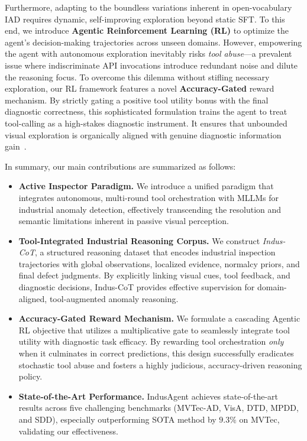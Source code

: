 \documentclass{article}
\begin{document}
Furthermore, adapting to the boundless variations inherent in open-vocabulary IAD requires dynamic, self-improving exploration beyond static SFT. To this end, we introduce \textbf{Agentic Reinforcement Learning (RL)} to optimize the agent's decision-making trajectories across unseen domains. However, empowering the agent with autonomous exploration inevitably risks \emph{tool abuse}—a prevalent issue where indiscriminate API invocations introduce redundant noise and dilute the reasoning focus. To overcome this dilemma without stifling necessary exploration, our RL framework features a novel \textbf{Accuracy-Gated} reward mechanism. By strictly gating a positive tool utility bonus with the final diagnostic correctness, this sophisticated formulation trains the agent to treat tool-calling as a high-stakes diagnostic instrument. It ensures that unbounded visual exploration is organically aligned with genuine diagnostic information gain~\citep{schick2024toolformer, zeng2024agenttuning}.

In summary, our main contributions are summarized as follows:
\begin{itemize}[leftmargin=*,nosep]
    \item \textbf{Active Inspector Paradigm.} We introduce a unified paradigm that integrates autonomous, multi-round tool orchestration with MLLMs for industrial anomaly detection, effectively transcending the resolution and semantic limitations inherent in passive visual perception.
    \item \textbf{Tool-Integrated Industrial Reasoning Corpus.} 
    We construct \emph{Indus-CoT}, a structured reasoning dataset that encodes industrial inspection trajectories with global observations, localized evidence, normalcy priors, and final defect judgments. 
    By explicitly linking visual cues, tool feedback, and diagnostic decisions, Indus-CoT provides effective supervision for domain-aligned, tool-augmented anomaly reasoning.
    \item \textbf{Accuracy-Gated Reward Mechanism.} We formulate a cascading Agentic RL objective that utilizes a multiplicative gate to seamlessly integrate tool utility with diagnostic task efficacy. By rewarding tool orchestration \emph{only} when it culminates in correct predictions, this design successfully eradicates stochastic tool abuse and fosters a highly judicious, accuracy-driven reasoning policy.
    \item \textbf{State-of-the-Art Performance.} IndusAgent achieves state-of-the-art results across five challenging benchmarks (MVTec-AD, VisA, DTD, MPDD, and SDD), especially outperforming SOTA method by $9.3\%$ on MVTec, validating our effectiveness. 
\end{itemize}
\end{document}
